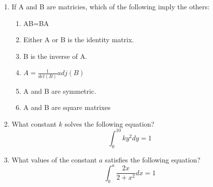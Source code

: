 \documentclass[11pt]{article}
\begin{document}
\begin{enumerate}
\begin{enumerate}

\pagebreak

\item Find the rank of 
$A=\begin{bmatrix} 
3& 1& 1&2\\
2& 1& -1&2\\
0& 3& 2&0\\
1& 0& 3&0
\end{bmatrix}$
\bigskip
\bigskip
\bigskip
\bigskip


\item What $x$ would make the following matrix singular?
$$\begin{bmatrix}
1&7\\ x&6
\end{bmatrix}$$
\end{enumerate}
\bigskip
\bigskip
\bigskip
\bigskip
\vspace{.2in}

\item If A and B are matricies, which of the following imply the others: 
\begin{enumerate}
\item AB=BA
\item Either A or B is the identity matrix.
\item B is the inverse of A.
\item $A=\frac{1}{det(B)}adj(B)$
\item A and B are symmetric.
\item A and B are square matrixes
\end{enumerate}

\pagebreak

\item What constant $k$ solves the following equation?
$$\int_0^{10} ky^2dy=1$$
\bigskip
\bigskip
\bigskip
\bigskip\bigskip
\bigskip
\bigskip
\bigskip\bigskip
\bigskip
\bigskip
\bigskip\bigskip
\bigskip
\bigskip
\bigskip
\item What values of the constant $a$ satisfies the following equation?
$$\int_0^a \frac{2x}{2+x^2}dx=1$$


\end{enumerate}
\end{document}
